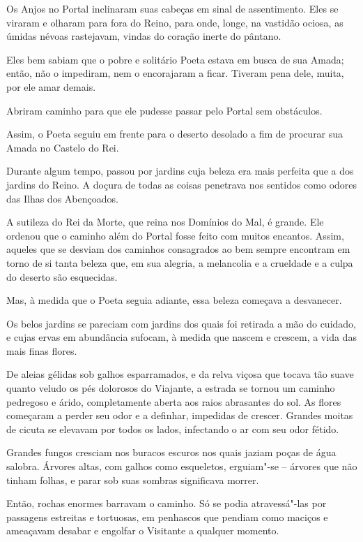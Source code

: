 Os Anjos no Portal inclinaram suas cabeças em sinal de assentimento.
Eles se viraram e olharam para fora do Reino, para onde, longe, na
vastidão ociosa, as úmidas névoas rastejavam, vindas do coração inerte
do pântano.

Eles bem sabiam que o pobre e solitário Poeta estava em busca de sua
Amada; então, não o impediram, nem o encorajaram a ficar. Tiveram
pena dele, muita, por ele amar demais.

Abriram caminho para que ele pudesse passar pelo Portal sem obstáculos.

Assim, o Poeta seguiu em frente para o deserto desolado a fim de procurar
sua Amada no Castelo do Rei.

Durante algum tempo, passou por jardins cuja beleza era mais perfeita
que a dos jardins do Reino. A doçura de todas as coisas penetrava nos
sentidos como odores das Ilhas dos Abençoados.

A sutileza do Rei da Morte, que reina nos Domínios do Mal, é grande. Ele
ordenou que o caminho além do Portal fosse feito com muitos encantos.
Assim, aqueles que se desviam dos caminhos consagrados ao bem sempre
encontram em torno de si tanta beleza que, em sua alegria, a melancolia
e a crueldade e a culpa do deserto são esquecidas.

Mas, à medida que o Poeta seguia adiante, essa beleza começava a
desvanecer.

Os belos jardins se pareciam com jardins dos quais foi retirada a mão do
cuidado, e cujas ervas em abundância sufocam, à medida que nascem e
crescem, a vida das mais finas flores.

De aleias gélidas sob galhos esparramados, e da relva viçosa que tocava
tão suave quanto veludo os pés dolorosos do Viajante, a estrada se
tornou um caminho pedregoso e árido, completamente aberta aos raios
abrasantes do sol. As flores começaram a perder seu odor e a definhar,
impedidas de crescer. Grandes moitas de cicuta se elevavam por todos os
lados, infectando o ar com seu odor fétido.

Grandes fungos cresciam nos buracos escuros nos quais jaziam poças de
água salobra. Árvores altas, com galhos como esqueletos, erguiam"-se --
árvores que não tinham folhas, e parar sob suas sombras significava
morrer.

Então, rochas enormes barravam o caminho. Só se podia atravessá"-las por
passagens estreitas e tortuosas, em penhascos que pendiam como maciços
e ameaçavam desabar e engolfar o Visitante a qualquer momento.

